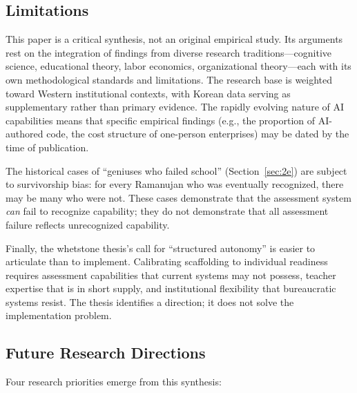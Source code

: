 \documentclass[12pt]{article}
\begin{document}
\subsection{Limitations}
\label{sec:limitations}

This paper is a critical synthesis, not an original empirical study. Its arguments rest on the integration of findings from diverse research traditions---cognitive science, educational theory, labor economics, organizational theory---each with its own methodological standards and limitations. The research base is weighted toward Western institutional contexts, with Korean data serving as supplementary rather than primary evidence. The rapidly evolving nature of AI capabilities means that specific empirical findings (e.g., the proportion of AI-authored code, the cost structure of one-person enterprises) may be dated by the time of publication.

The historical cases of ``geniuses who failed school'' (Section~\ref{sec:2e}) are subject to survivorship bias: for every Ramanujan who was eventually recognized, there may be many who were not. These cases demonstrate that the assessment system \emph{can} fail to recognize capability; they do not demonstrate that all assessment failure reflects unrecognized capability.

Finally, the whetstone thesis's call for ``structured autonomy'' is easier to articulate than to implement. Calibrating scaffolding to individual readiness requires assessment capabilities that current systems may not possess, teacher expertise that is in short supply, and institutional flexibility that bureaucratic systems resist. The thesis identifies a direction; it does not solve the implementation problem.

\subsection{Future Research Directions}
\label{sec:future}

Four research priorities emerge from this synthesis:
\end{document}
